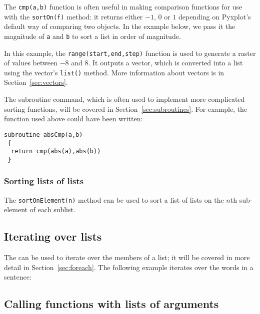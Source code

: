 \noindent The {\tt cmp(a,b)} function is often useful in making comparison
functions for use with the {\tt sortOn(f)} method: it returns either $-1$, $0$
or $1$ depending on Pyxplot's default way of comparing two objects. In the
example below, we pass it the magnitude of {\tt a} and {\tt b} to sort a list
in order of magnitude.

\vspace{3mm}

\vspace{3mm}

In this example, the {\tt range(start,end,step)} function is used to generate a
raster of values between $-8$ and $8$. It outputs a vector, which is converted
into a list using the vector's {\tt list()} method. More information about
vectors is in Section~\ref{sec:vectors}.

The subroutine command, which is often used to implement more complicated
sorting functions, will be covered in Section~\ref{sec:subroutines}. For
example, the function used above could have been written:

\begin{verbatim}
subroutine absCmp(a,b)
 {
  return cmp(abs(a),abs(b))
 }
\end{verbatim}

\subsubsection{Sorting lists of lists}

The {\tt sortOnElement(n)} method can be used to sort a list of lists on the
$n$th sub-element of each sublist.

\vspace{3mm}

\vspace{3mm}

\subsection{Iterating over lists}

The  can be used to iterate over the members of a list; it
will be covered in more detail in Section~\ref{sec:foreach}. The following
example iterates over the words in a sentence:

\vspace{3mm}

\vspace{3mm}

\subsection{Calling functions with lists of arguments}

